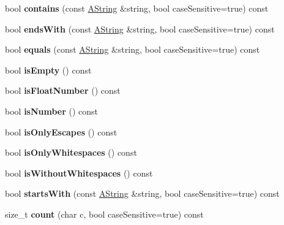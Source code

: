 \begin{DoxyCompactItemize}
bool {\bfseries contains} (const \mbox{\hyperlink{class_a_string}{A\+String}} \&string, bool case\+Sensitive=true) const
\item 
\mbox{\label{class_a_string_ae73b26b17b08f56851737b5cf45a21e6}} 
bool {\bfseries ends\+With} (const \mbox{\hyperlink{class_a_string}{A\+String}} \&string, bool case\+Sensitive=true) const
\item 
\mbox{\label{class_a_string_a783f45da45fb0e7685932d44a188e831}} 
bool {\bfseries equals} (const \mbox{\hyperlink{class_a_string}{A\+String}} \&string, bool case\+Sensitive=true) const
\item 
\mbox{\label{class_a_string_ab8146522d4484d8aec3005dbe60dcfef}} 
bool {\bfseries is\+Empty} () const
\item 
\mbox{\label{class_a_string_a693a5dd685ee812406e6643fd964ec7c}} 
bool {\bfseries is\+Float\+Number} () const
\item 
\mbox{\label{class_a_string_a8b3516a3c934fde801074ef792f1468b}} 
bool {\bfseries is\+Number} () const
\item 
\mbox{\label{class_a_string_a7d7f2482f18578ddda0ec825ef58545a}} 
bool {\bfseries is\+Only\+Escapes} () const
\item 
\mbox{\label{class_a_string_a506192a29a529eccacfa3a4dfb1a234b}} 
bool {\bfseries is\+Only\+Whitespaces} () const
\item 
\mbox{\label{class_a_string_a166108dfe6ceecf9267441715c3a7bce}} 
bool {\bfseries is\+Without\+Whitespaces} () const
\item 
\mbox{\label{class_a_string_aef584231c6ddc8925fbfa92ccf22cf53}} 
bool {\bfseries starts\+With} (const \mbox{\hyperlink{class_a_string}{A\+String}} \&string, bool case\+Sensitive=true) const
\item 
\mbox{\label{class_a_string_aec69f5126101c65f03723a7969d5cccd}} 
size\+\_\+t {\bfseries count} (char c, bool case\+Sensitive=true) const
\item 

\end{DoxyCompactItemize}
